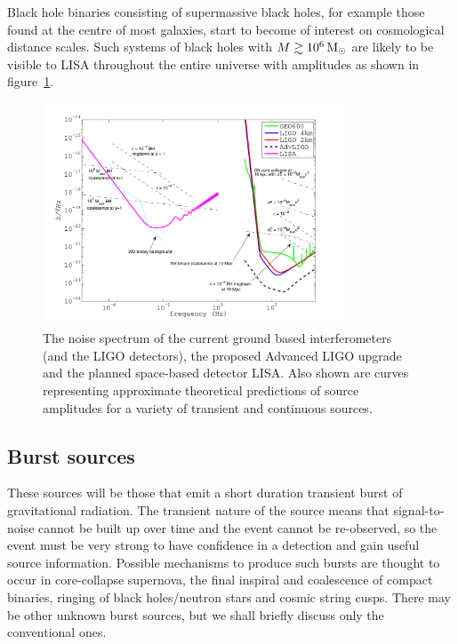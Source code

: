 Black hole binaries consisting of supermassive black holes, for example those found at the centre
of most galaxies, start to become of interest on cosmological distance scales. Such systems of
black holes with $M \gtrsim 10^6\,{\rm M}_{\odot}$ are likely to be visible to LISA throughout the
entire universe with amplitudes as shown in figure~\ref{noisespectrumall}.
\begin{figure}[!htbp]
\begin{center}
\includegraphics[width=0.8\textwidth]{figs/noisespectrumall}\caption[Detector noise curves and
source amplitudes.]{The noise spectrum of the current ground based interferometers (\geo and the
LIGO detectors), the proposed Advanced LIGO upgrade and the planned space-based detector LISA. Also
shown are curves representing approximate theoretical predictions of source amplitudes for a variety
of transient and continuous sources.}\label{noisespectrumall}
\end{center}
\end{figure}

\subsection{Burst sources}
These sources will be those that emit a short duration transient burst of gravitational radiation.
The transient nature of the source means that signal-to-noise cannot be built up over time and the
event cannot be re-observed, so the event must be very strong to have confidence in a detection and
gain useful source information. Possible mechanisms to produce such bursts are thought to occur in
core-collapse supernova, the final inspiral and coalescence of compact binaries, ringing of black
holes/neutron stars and cosmic string cusps. There may be other unknown burst sources, but we shall
briefly discuss only the conventional ones.

